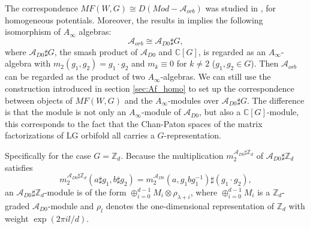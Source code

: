 \documentclass[a4paper,11pt]{article}
\def\cA{\mathcal{A}}
\newcommand{\Af}{{A_\infty}}
\numberwithin{equation}{section}
\begin{document}
The correspondence $MF(W,G)\cong D(Mod-\mathcal{A}_{orb})$ was studied in 
\cite{Ashok:2004zb,Ashok:2004xq}, for homogeneous potentials. Moreover, the 
results in 
\cite{tu2014matrix} implies the following isomorphism of $A_{\infty}$ algebras:
\begin{equation}
\mathcal{A}_{orb}\cong \cA_{D0} \sharp G,
\end{equation}
where $\cA_{D0} \sharp G$, the smash product of $\cA_{D0}$ and $\mathbb{C}[G]$, 
is regarded as an $\Af$-algebra with $m_2(g_1,g_2) = g_1 \cdot g_2$ 
and $m_k\equiv 0$ for $k \neq 2$ ($g_{1},g_{2}\in G$). Then $\mathcal{A}_{orb}$ 
can be regarded as the 
product of two $A_{\infty}$-algebras. We can still use the construction 
introduced in 
section \ref{sec:Af_homo} to set up the correspondence between objects of 
$MF(W,G)$ and the $\Af$-modules over $\cA_{D0} \sharp G$. The difference is 
that the module is not only an $\Af$-module of $\cA_{D0}$, but also a 
$\mathbb{C}[G]$-module, this corresponds to the fact that the Chan-Paton spaces 
of 
the matrix factorizations of LG orbifold all carries a $G$-representation.

Specifically for the case $G = \mathbb{Z}_d$. Because the multiplication 
$m^{\cA_{D0} \sharp \mathbb{Z}_d}_2$ of $\cA_{D0} \sharp \mathbb{Z}_d$ satisfies
\begin{equation}
m^{\cA_{D0} \sharp \mathbb{Z}_d}_2 (a \sharp g_1, b \sharp g_2) = m_2^{\cA_{D0}}(a, g_1 b g_1^{-1}) \sharp (g_1 \cdot g_2),
\end{equation}
an $\cA_{D0} \sharp \mathbb{Z}_d$-module is of the form $\oplus_{i=0}^{d-1} M_i \otimes \rho_{\lambda+i}$, where $\oplus_{i=0}^{d-1} M_i$ is a $\mathbb{Z}_d$-graded $\cA_{D0}$-module and $\rho_l$ denotes the one-dimensional representation of $\mathbb{Z}_d$ with weight $\exp(2 \pi i l/d)$.
 
\end{document}
